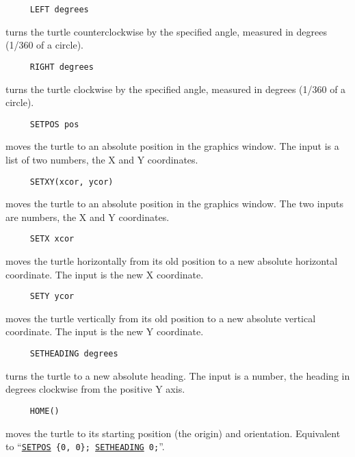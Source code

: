 \begin{verbatim}
     LEFT degrees
\end{verbatim}
turns the turtle counterclockwise by the specified angle, measured in
degrees (1/360 of a circle).

\begin{verbatim}
     RIGHT degrees
\end{verbatim}
turns the turtle clockwise by the specified angle, measured in degrees
(1/360 of a circle).

\begin{verbatim}
     SETPOS pos
\end{verbatim}
\label{logoturtle:setpos}
moves the turtle to an absolute position in the graphics window.  The
input is a list of two numbers, the X and Y coordinates.

\begin{verbatim}
     SETXY(xcor, ycor)
\end{verbatim}
moves the turtle to an absolute position in the graphics window.  The
two inputs are numbers, the X and Y coordinates.

\begin{verbatim}
     SETX xcor
\end{verbatim}
moves the turtle horizontally from its old position to a new absolute
horizontal coordinate.  The input is the new X coordinate.

\begin{verbatim}
     SETY ycor
\end{verbatim}
moves the turtle vertically from its old position to a new absolute
vertical coordinate.  The input is the new Y coordinate.

\begin{verbatim}
     SETHEADING degrees
\end{verbatim}
\label{logoturtle:setheading}
turns the turtle to a new absolute heading.  The input is a number,
the heading in degrees clockwise from the positive Y axis.

\begin{verbatim}
     HOME()
\end{verbatim}
\label{logoturtle:home}
moves the turtle to its starting position (the origin) and orientation.
Equivalent to ``\texttt{\hyperref[logoturtle:setpos]{SETPOS}~\{0,~0\};
  \hyperref[logoturtle:setheading]{SETHEADING}~0;}''.


